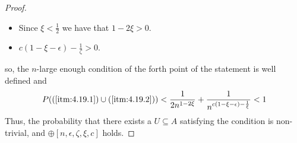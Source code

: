 \begin{proof}
\begin{itemize}
                \item Since $\xi < \frac{1}{2}$ we have that $1 - 2\xi > 0$.
                \item $c (1 - \xi - \epsilon) - \frac{1}{\zeta}> 0$.
            \end{itemize}
            so, the $n$-large enough condition of the forth point of the statement is well defined and
            \[
                P((\ref{itm:4.19.1}) \cup (\ref{itm:4.19.2}))
                    < \frac{1}{2n^{1-2\xi}} + \frac{1}{n^{c (1 - \xi - \epsilon) - \frac{1}{\xi}}}
                    < 1
            \]
            Thus, the probability that there exists a $U \subseteq A$ satisfying the condition is non-trivial,
            and $\oplus[n, \epsilon, \zeta, \xi, c]$ holds.
        \end{proof}

